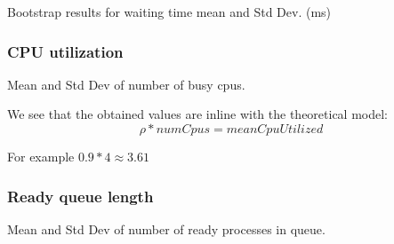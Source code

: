 \begin{table}[H]
    \centering
    \scriptsize
    
    \caption{Bootstrap results for waiting time mean and Std Dev. (ms)}
    \label{tab:fcfsWait}
\end{table}


\subsubsection{CPU utilization}

\label{sec:fcfsCpuUtilization}

\begin{table}[H]
    \centering
    \scriptsize
    
    \caption{Mean and Std Dev of number of busy cpus.}
    \label{tab:fcfsCpus}
\end{table}

We see that the obtained values are inline with the theoretical model:
\begin{equation}
    \rho * numCpus = meanCpuUtilized
\end{equation}


For example $0.9 * 4 \approx 3.61$ 

\subsubsection{Ready queue length}

\begin{table}[H]
    \centering
    \scriptsize
    
    \caption{Mean and Std Dev of number of ready processes in queue.}
    \label{tab:fcfsReadyProc}
\end{table}
